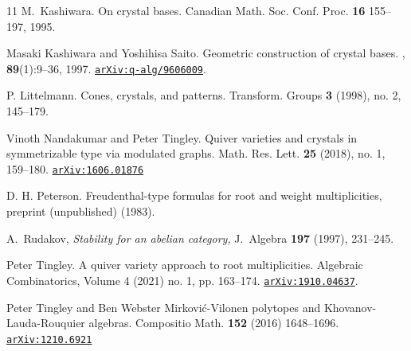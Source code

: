 \documentclass{amsart}
\numberwithin{equation}{section}
\numberwithin{figure}{section}
\numberwithin{table}{section}
\theoremstyle{definition}
\newcommand{\arxiv}[1]{\href{http://arxiv.org/abs/#1}{\tt arXiv:\nolinkurl{#1}}}
\begin{document}
\begin{thebibliography}{11}
M.~Kashiwara.
\newblock On crystal bases.
 { Canadian Math. Soc. Conf. Proc. }{\bf 16} 155--197, 1995.

Masaki Kashiwara and Yoshihisa Saito.
\newblock Geometric construction of crystal bases.
, {\bf 89}(1):9--36, 1997.
\newblock \arxiv{q-alg/9606009}.

P. Littelmann. Cones, crystals, and patterns. { Transform. Groups} {\bf 3} (1998), no. 2, 145--179.


Vinoth Nandakumar and Peter Tingley. Quiver varieties and crystals in symmetrizable type via modulated graphs. Math. Res. Lett. {\bf 25} (2018), no. 1, 159--180. \arxiv{1606.01876} 


 D. H. Peterson. Freudenthal-type formulas for root and weight multiplicities, preprint
(unpublished) (1983).

A.~Rudakov, \textit{Stability for an abelian category,} J.\ Algebra
\textbf{197} (1997), 231--245.

 Peter Tingley. 
A quiver variety approach to root multiplicities. Algebraic Combinatorics, Volume 4 (2021) no. 1, pp. 163--174.
 \arxiv{1910.04637}. 


Peter Tingley and Ben Webster
Mirkovi\'c-Vilonen polytopes and Khovanov-Lauda-Rouquier algebras.  Compositio Math. {\bf 152} (2016) 1648--1696.  \arxiv{1210.6921}


\end{thebibliography}
\end{document}
